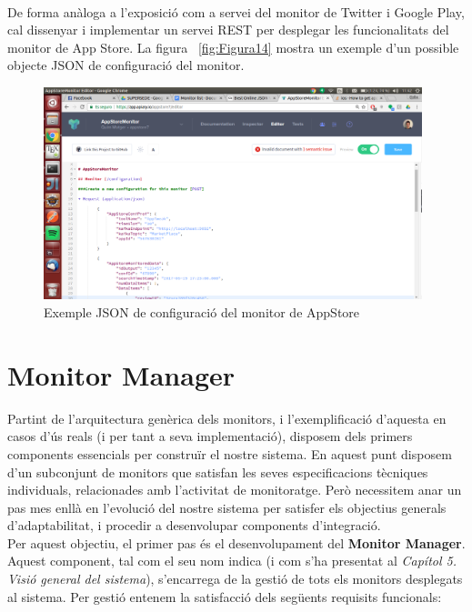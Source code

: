 \\

De forma anàloga a l'exposició com a servei del monitor de Twitter i Google Play, cal dissenyar i implementar un servei REST per desplegar les funcionalitats del monitor de App Store. La figura ~\ref{fig:Figura14} mostra un exemple d'un possible objecte JSON de configuració del monitor.\\

\begin{figure}[!h]
\centering
\includegraphics[width=11cm]{Figures/appstore-conf}
\decoRule
\caption[Exemple JSON de configuració del monitor de AppStore]{Exemple JSON de configuració del monitor de AppStore}
\label{fig:appstore-conf}
\end{figure}

\section{Monitor Manager}

Partint de l'arquitectura genèrica dels monitors, i l'exemplificació d'aquesta en casos d'ús reals (i per tant a seva implementació), disposem dels primers components essencials per construïr el nostre sistema. En aquest punt disposem d'un subconjunt de monitors que satisfan les seves especificacions tècniques individuals, relacionades amb l'activitat de monitoratge. Però necessitem anar un pas mes enllà en l'evolució del nostre sistema per satisfer els objectius generals d'adaptabilitat, i procedir a desenvolupar components d'integració.\\

Per aquest objectiu, el primer pas és el desenvolupament del \textbf{Monitor Manager}. Aquest component, tal com el seu nom indica (i com s'ha presentat al \textit{Capítol 5. Visió general del sistema}), s'encarrega de la gestió de tots els monitors desplegats al sistema. Per gestió entenem la satisfacció dels següents requisits funcionals:

